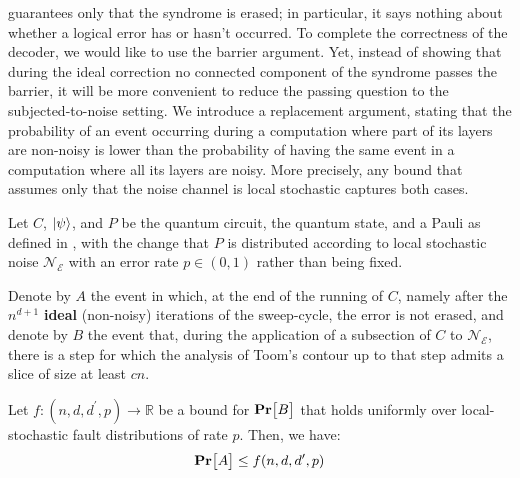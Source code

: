  guarantees only that the syndrome is erased; in particular, it says nothing about whether a logical error has or hasn't occurred. To complete the correctness of the decoder, we would like to use the barrier argument. Yet, instead of showing that during the ideal correction no connected component of the syndrome passes the barrier, it will be more convenient to reduce the passing question to the subjected-to-noise setting. We introduce a replacement argument, stating that the probability of an event occurring during a computation where part of its layers are non-noisy is lower than the probability of having the same event in a computation where all its layers are noisy. More precisely, any bound that assumes only that the noise channel is local stochastic captures both cases.
\begin{claim}
  \label{claim:replace}
  Let $C$, $\ket{\psi}$, and $P$ be the quantum circuit, the quantum state, and a Pauli as defined in , with the change that $P$ is distributed according to local stochastic noise $\mathcal{N}_{\mathcal{E}}$ with an error rate $p\in (0,1)$ rather than being fixed.

Denote by $A$ the event in which, at the end of the running of $C$, namely after the $n^{d+1}$ \textbf{ideal} (non-noisy) iterations of the sweep-cycle, the error is not erased, and denote by $B$ the event that, during the application of a subsection of $C$ to $\mathcal{N}_{\mathcal{E}}$, there is a step for which the analysis of Toom's contour up to that step admits a slice of size at least $cn$.


Let $f:(n,d,d^{\prime},p) \rightarrow \mathbb{R}$ be a bound for $\mathbf{Pr} \big[ B \big]$ that holds uniformly over local-stochastic fault distributions of rate $p$. Then, we have:
  \begin{equation}
    \label{equ:replacement}
    \begin{split}
      \mathbf{Pr} \big[ A \big] \le f(n,d,d^{\prime},p)
    \end{split}
  \end{equation}
\end{claim}
